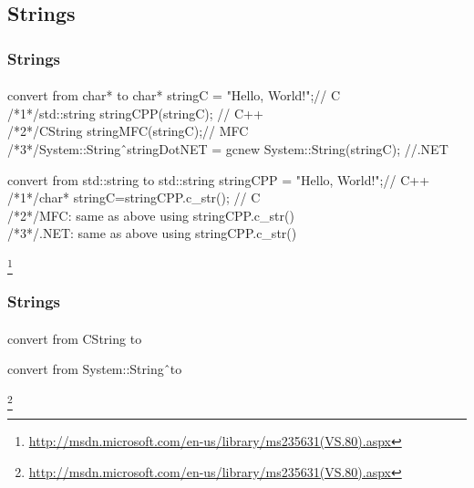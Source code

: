\subsection{Strings}
\begin{frame}
\frametitle{Strings}
\framesubtitle{}
\logoCSIPCPL\mypagenum
	\begin{block}{convert from char* to}
		\tiny
		{\color{blue}char}* stringC = "Hello, World!";{\color{green}// C}\\ 
		\vspace{0.1in}
		{\color{green}/*1*/}{\color{blue}std::string} stringCPP(stringC); {\color{green}// C++}\\
    		{\color{green}/*2*/}{\color{blue}CString} stringMFC(stringC);{\color{green}// MFC}\\
		{\color{green}/*3*/}{\color{blue}System::String}\^ \ stringDotNET = {\color{blue}gcnew System::String}(stringC); {\color{green}//.NET}\\
	\end{block}
	\vspace{0.2in}
	\begin{block}{convert from std::string to}
		\tiny
		{\color{blue}std::string} stringCPP = "Hello, World!";{\color{green}// C++}\\  
		\vspace{0.1in}
		{\color{green}/*1*/}{\color{blue}char}* stringC=stringCPP.c\_str(); {\color{green}// C}\\
    		{\color{green}/*2*/}MFC: same as above using stringCPP.c\_str()\\
		{\color{green}/*3*/}.NET: same as above using stringCPP.c\_str()\\
	\end{block}
\footnote{\tiny {\color{blue}  \href{http://msdn.microsoft.com/en-us/library/ms235631(VS.80).aspx}{http://msdn.microsoft.com/en-us/library/ms235631(VS.80).aspx}}}
\end{frame}


\begin{frame}
\frametitle{Strings}
\framesubtitle{}
\logoCSIPCPL\mypagenum
	\begin{block}{convert from CString to}
	\end{block}
	\vspace{0.2in}
	\begin{block}{convert from System::String\^ \ to}
	\end{block}
\footnote{\tiny {\color{blue}  \href{http://msdn.microsoft.com/en-us/library/ms235631(VS.80).aspx}{http://msdn.microsoft.com/en-us/library/ms235631(VS.80).aspx}}}
\end{frame}


